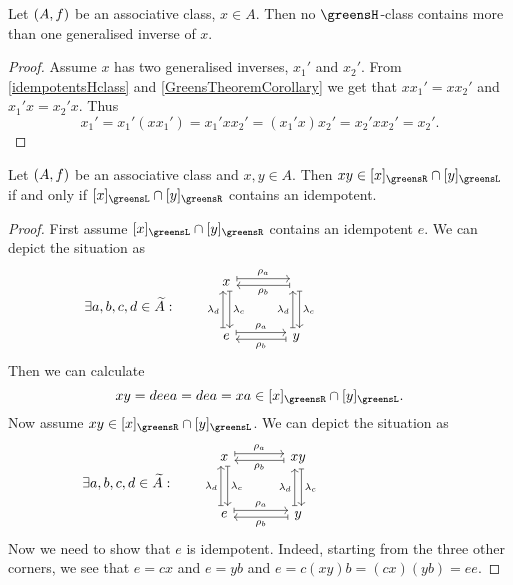 \begin{lemma}
Let $\left( A, f \right)$ be an associative class, $x\in A$. Then no $\greensH$-class contains more than one generalised inverse of $x$.
\end{lemma}
\begin{proof}
Assume $x$ has two generalised inverses, $x_1'$ and $x_2'$. From \ref{idempotentsHclass} and \ref{GreensTheoremCorollary} we get that $xx_1' = xx_2'$ and $x_1'x = x_2'x$. Thus
\[ x_1' = x_1'(xx_1') = x_1'xx_2' = (x_1'x)x_2' =  x_2'xx_2' = x_2'. \]
\end{proof}

\begin{proposition}
Let $\left( A, f \right)$ be an associative class and $x,y\in A$. Then $xy\in [x]_\greensR \cap [y]_\greensL$ \textup{if and only if} $[x]_\greensL \cap [y]_\greensR$ contains an idempotent.
\end{proposition}
\begin{proof}
First assume $[x]_\greensL \cap [y]_\greensR$ contains an idempotent $e$. We can depict the situation as
\[ \hspace{-8.4em} \exists a,b,c,d \in \widetilde{A}: \qquad \begin{tikzcd}[sep=large]
x \ar[r, maps to, shift left, "\rho_a"] \ar[d, maps to, shift left, "\lambda_c"] &  \ar[l, maps to, shift left, "\rho_b"] \ar[d, maps to, shift left, "\lambda_c"] \\
e \ar[u, maps to, shift left, "\lambda_d"] \ar[r, maps to, shift left, "\rho_a"] & y \ar[u, maps to, shift left, "\lambda_d"] \ar[l, maps to, shift left, "\rho_b"]
\end{tikzcd} \]
Then we can calculate
\[ xy = deea = dea = xa \in [x]_\greensR \cap [y]_\greensL. \]
Now assume $xy\in [x]_\greensR \cap [y]_\greensL$.
We can depict the situation as
\[ \hspace{-8.4em} \exists a,b,c,d \in \widetilde{A}: \qquad \begin{tikzcd}[sep=large]
x \ar[r, maps to, shift left, "\rho_a"] \ar[d, maps to, shift left, "\lambda_c"] & xy \ar[l, maps to, shift left, "\rho_b"] \ar[d, maps to, shift left, "\lambda_c"] \\
e \ar[u, maps to, shift left, "\lambda_d"] \ar[r, maps to, shift left, "\rho_a"] & y \ar[u, maps to, shift left, "\lambda_d"] \ar[l, maps to, shift left, "\rho_b"]
\end{tikzcd} \]
Now we need to show that $e$ is idempotent. Indeed, starting from the three other corners, we see that $e = cx$ and $e = yb$ and $e = c(xy)b = (cx)(yb) = ee$.
\end{proof}



